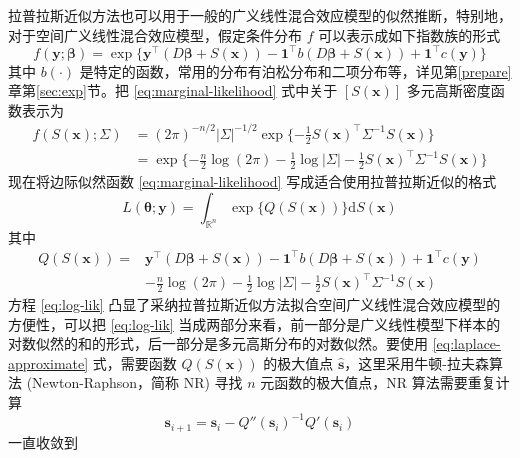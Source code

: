 \documentclass[12pt,a4paper,UTF8,twoside]{book}
\theoremstyle{definition}
\theoremstyle{definition}
\theoremstyle{definition}
\theoremstyle{remark}
\begin{document}
拉普拉斯近似方法也可以用于一般的广义线性混合效应模型的似然推断，特别地，对于空间广义线性混合效应模型，假定条件分布
\(f\) 可以表示成如下指数族的形式 \begin{equation}
f(\mathbf{y};\boldsymbol{\beta})  = \exp\{\mathbf{y}^{\top} (D\boldsymbol{\beta} + S(\mathbf{x})) - \mathbf{1}^{\top} b( D\boldsymbol{\beta} + S(\mathbf{x})) + \mathbf{1}^{\top} c(\mathbf{y}) \}  \label{eq:exponential-family}
\end{equation} \noindent 其中 \(b(\cdot)\)
是特定的函数，常用的分布有泊松分布和二项分布等，详见第\ref{prepare}章第\ref{sec:exp}节。把
\eqref{eq:marginal-likelihood} 式中关于 \([S(\mathbf{x})]\)
多元高斯密度函数表示为 \begin{align}
f(S(\mathbf{x});\Sigma) & = (2\pi)^{-n/2}|\Sigma|^{-1/2} \exp\{ -\frac{1}{2}S(\mathbf{x})^{\top} \Sigma^{-1} S(\mathbf{x}) \} \\
                      & = \exp\{ - \frac{n}{2}\log (2\pi) -\frac{1}{2}\log |\Sigma|  -\frac{1}{2}S(\mathbf{x})^{\top} \Sigma^{-1} S(\mathbf{x}) \} \label{eq:multi-gaussian-dist}
\end{align} \noindent 现在将边际似然函数 \eqref{eq:marginal-likelihood}
写成适合使用拉普拉斯近似的格式 \begin{equation}
L(\boldsymbol{\theta};\mathbf{y}) = \int_{\mathbb{R}^n} \exp\{Q(S(\mathbf{x}))\} \mathrm{d}S(\mathbf{x}) 
\end{equation} \noindent 其中 \begin{equation}
\begin{aligned}
Q(S(\mathbf{x})) ={} &  \mathbf{y}^{\top} (D \boldsymbol{\beta} + S(\mathbf{x})) - \mathbf{1}^{\top} b(D \boldsymbol{\beta} + S(\mathbf{x})) + \mathbf{1}^{\top}c(\mathbf{y}) \\
                   & - \frac{n}{2}\log (2\pi) -\frac{1}{2}\log |\Sigma| -\frac{1}{2}S(\mathbf{x})^{\top} \Sigma^{-1} S(\mathbf{x})
\end{aligned} \label{eq:log-lik}
\end{equation} \noindent 方程 \eqref{eq:log-lik}
凸显了采纳拉普拉斯近似方法拟合空间广义线性混合效应模型的方便性，可以把
\eqref{eq:log-lik}
当成两部分来看，前一部分是广义线性模型下样本的对数似然的和的形式，后一部分是多元高斯分布的对数似然。要使用
\eqref{eq:laplace-approximate} 式，需要函数 \(Q(S(\mathbf{x}))\)
的极大值点 \(\hat{\mathbf{s}}\)，这里采用牛顿-拉夫森算法
(Newton-Raphson，简称 NR) 寻找 \(n\) 元函数的极大值点，NR
算法需要重复计算 \begin{equation}
\mathbf{s}_{i+1} = \mathbf{s}_{i} - Q''(\mathbf{s}_{i})^{-1}Q'(\mathbf{s}_{i}) 
\end{equation} \noindent 一直收敛到
\end{document}
